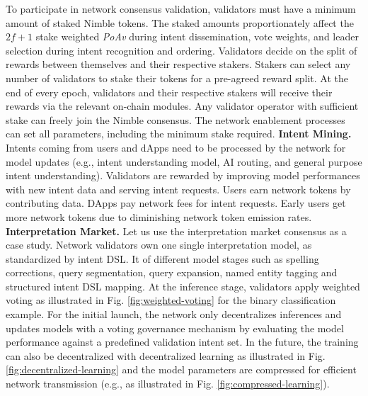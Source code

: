 \documentclass[11pt,letterpaper,twocolumn]{article}
\begin{document}
To participate in network consensus validation, validators must 
have a minimum amount of staked Nimble tokens. The staked amounts proportionately affect the $2f + 1$ stake
weighted \emph{PoAv} during intent dissemination, vote weights, and leader selection during intent recognition and ordering. Validators decide on the split of rewards between themselves and their
respective stakers. Stakers can select any number of validators to stake their tokens for a
pre-agreed reward split. At the end of every epoch, validators and their respective stakers will receive
their rewards via the relevant on-chain modules.
Any validator operator with sufficient stake can freely join the Nimble consensus. The network enablement processes can set all parameters,
including the minimum stake required.
\newline
\newline
\noindent \textbf{Intent Mining.} Intents coming from users and dApps need to be processed by the network for model updates (e.g., intent understanding model, AI routing, and general purpose intent understanding). Validators are rewarded by improving model performances with new intent data and serving intent requests. Users earn network
tokens by contributing data. DApps pay network fees for intent requests. Early users get more network tokens due to diminishing network token emission rates.
\newline
\newline
\noindent \textbf{Interpretation Market.} Let us use the interpretation market consensus as a case study. Network validators own one single interpretation model, as standardized by intent DSL. It of
different model stages such as spelling corrections, query
segmentation, query expansion, named entity tagging and structured intent DSL mapping.
At the inference stage, validators apply
weighted voting as illustrated in Fig. \ref{fig:weighted-voting} for the binary classification example. For the initial launch, the network only decentralizes inferences and updates
models with a voting governance mechanism by evaluating the model performance against a predefined validation intent set. In the future, the training can also be decentralized with
decentralized learning \cite{lalitha2018fully, li2020federated, sattler2019robust} as illustrated in Fig. \ref{fig:decentralized-learning}
and the model parameters are compressed for efficient network
transmission  \cite{yang2022hardware, chen2022self, zhang2021fpga, hawkins2021bayesian, hawkins2022towards, roh2021sample} (e.g., as illustrated in Fig. \ref{fig:compressed-learning}).
\end{document}
